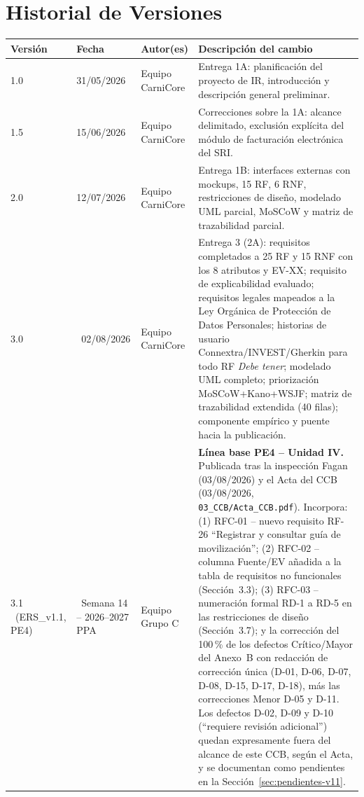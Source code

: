 \documentclass[11pt,a4paper]{article}
\begin{document}
\section*{Historial de Versiones}
\begin{longtable}{|p{1.5cm}|p{2.2cm}|p{3cm}|p{8cm}|}
\hline
\textbf{Versión} & \textbf{Fecha} & \textbf{Autor(es)} & \textbf{Descripción del cambio} \\
\hline
1.0 & 31/05/2026 & Equipo CarniCore & Entrega 1A: planificación del proyecto de IR, introducción y descripción general preliminar. \\
\hline
1.5 & 15/06/2026 & Equipo CarniCore & Correcciones sobre la 1A: alcance delimitado, exclusión explícita del módulo de facturación electrónica del SRI. \\
\hline
2.0 & 12/07/2026 & Equipo CarniCore & Entrega 1B: interfaces externas con mockups, 15 RF, 6 RNF, restricciones de diseño, modelado UML parcial, MoSCoW y matriz de trazabilidad parcial. \\
\hline
3.0 & \ 02/08/2026 & Equipo CarniCore & Entrega 3 (2A): requisitos completados a 25 RF y 15 RNF con los 8 atributos y EV-XX; requisito de explicabilidad evaluado; requisitos legales mapeados a la Ley Orgánica de Protección de Datos Personales; historias de usuario Connextra/INVEST/Gherkin para todo RF \textit{Debe tener}; modelado UML completo; priorización MoSCoW+Kano+WSJF; matriz de trazabilidad extendida (40 filas); componente empírico y puente hacia la publicación. \\
\hline
3.1 \ (ERS\_v1.1, PE4) & \ Semana 14 -- 2026--2027 PPA & Equipo Grupo C & \textbf{Línea base PE4 -- Unidad IV.} Publicada tras la inspección Fagan (03/08/2026) y el Acta del CCB (03/08/2026, \texttt{03\_CCB/Acta\_CCB.pdf}). Incorpora: (1) RFC-01 -- nuevo requisito RF-26 ``Registrar y consultar guía de movilización''; (2) RFC-02 -- columna Fuente/EV añadida a la tabla de requisitos no funcionales (Sección~3.3); (3) RFC-03 -- numeración formal RD-1 a RD-5 en las restricciones de diseño (Sección~3.7); y la corrección del 100\,\% de los defectos Crítico/Mayor del Anexo~B con redacción de corrección única (D-01, D-06, D-07, D-08, D-15, D-17, D-18), más las correcciones Menor D-05 y D-11. Los defectos D-02, D-09 y D-10 (``requiere revisión adicional'') quedan expresamente fuera del alcance de este CCB, según el Acta, y se documentan como pendientes en la Sección~\ref{sec:pendientes-v11}. \\
\hline
\end{longtable}
\end{document}
